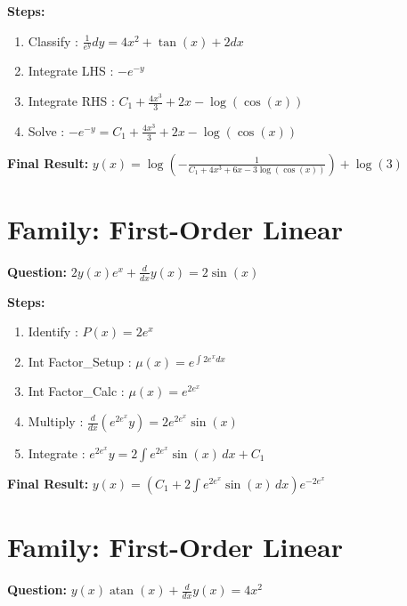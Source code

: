 \documentclass{article}
\begin{document}
\textbf{Steps:}
\begin{enumerate}
\item Classify :  $\frac{1}{e^{y}} dy = 4 x^{2} + \tan{\left(x \right)} + 2 dx$
\item Integrate LHS :  $- e^{- y}$
\item Integrate RHS :  $C_{1} + \frac{4 x^{3}}{3} + 2 x - \log{\left(\cos{\left(x \right)} \right)}$
\item Solve :  $- e^{- y} = C_{1} + \frac{4 x^{3}}{3} + 2 x - \log{\left(\cos{\left(x \right)} \right)}$
\end{enumerate}
\textbf{Final Result:} $y{\left(x \right)} = \log{\left(- \frac{1}{C_{1} + 4 x^{3} + 6 x - 3 \log{\left(\cos{\left(x \right)} \right)}} \right)} + \log{\left(3 \right)}$

\section*{Family: First-Order Linear}
\textbf{Question:} $2 y{\left(x \right)} e^{x} + \frac{d}{d x} y{\left(x \right)} = 2 \sin{\left(x \right)}$

\textbf{Steps:}
\begin{enumerate}
\item Identify :  $P(x) = 2 e^{x}$
\item Int Factor_Setup :  $\mu(x) = e^{\int 2 e^{x} dx}$
\item Int Factor_Calc :  $\mu(x) = e^{2 e^{x}}$
\item Multiply :  $\frac{d}{dx}(e^{2 e^{x}}y) = 2 e^{2 e^{x}} \sin{\left(x \right)}$
\item Integrate :  $e^{2 e^{x}}y = 2 \int e^{2 e^{x}} \sin{\left(x \right)}\, dx + C_1$
\end{enumerate}
\textbf{Final Result:} $y{\left(x \right)} = \left(C_{1} + 2 \int e^{2 e^{x}} \sin{\left(x \right)}\, dx\right) e^{- 2 e^{x}}$

\section*{Family: First-Order Linear}
\textbf{Question:} $y{\left(x \right)} \operatorname{atan}{\left(x \right)} + \frac{d}{d x} y{\left(x \right)} = 4 x^{2}$
\end{document}
